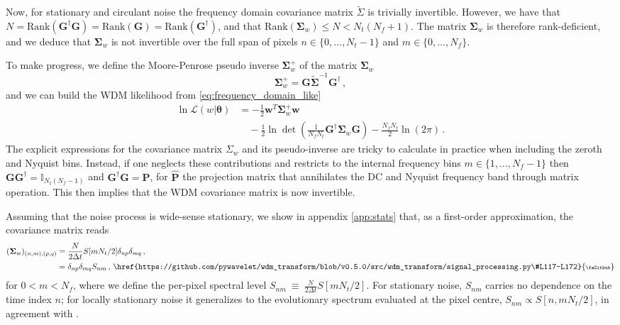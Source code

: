 \documentclass[twocolumn,preprintnumbers,
  superscriptaddress,
  nofootinbib,
  amsmath,
  amssymb,
  aps,
  prd,
  colorlinks=true,
  linkcolor=blue,
  urlcolor=blue,
  citecolor=blue,
  anchorcolor=blue
]{revtex4-2}
\DeclareRobustCommand{\codelink}[1]{\,\href{#1}{\mbox{\scalebox{0.65}{\faGithub}}}}
\begin{document}
Now, for stationary and circulant noise the frequency domain covariance matrix $\tilde{\Sigma}$ is trivially invertible. However, we have that $N = \text{Rank}(\boldsymbol{G}^{\dagger}\boldsymbol{G}) = \text{Rank}(\boldsymbol{G}) = \text{Rank}(\boldsymbol{G}^{\dagger})$, and that $\text{Rank}(\boldsymbol{\Sigma}_w)  \leq N < N_t(N_f+1)$. The matrix $\boldsymbol{\Sigma}_{w}$ is therefore rank-deficient, and we deduce that $\boldsymbol{\Sigma}_{w}$ is not invertible over the full span of pixels $n \in \{0,\ldots, N_t -1\}$ and $m\in\{0, \ldots, N_f\}$.

To make progress, we define the Moore-Penrose pseudo inverse $\boldsymbol{\Sigma}^+_{w}$ of the matrix $\boldsymbol{\Sigma}_w$
%
\begin{equation}\label{eq:pseudo_inv_cov}
\boldsymbol{\Sigma}_w^{+} = \boldsymbol{G}\tilde{\boldsymbol{\Sigma}}^{-1}\boldsymbol{G}^{\dagger}\,,
\end{equation}
%
and we can build the WDM likelihood from \eqref{eq:frequency_domain_like}
%
\begin{align}\label{eq:likelihood_G_Sigma_w}
    \ln\mathcal{L}(w|\boldsymbol{\theta}) &= -\frac{1}{2}\boldsymbol{w}^{T}\boldsymbol{\Sigma}_{w}^{+}\boldsymbol{w}  \\
    & \quad - \frac{1}{2}\ln\det \left(\frac{1}{N_fN_t}\boldsymbol{G}^{\dagger}\boldsymbol{\Sigma}_{w}\boldsymbol{G}\right) - \frac{N_fN_t}{2}\ln(2\pi)\,.
\end{align}
%
The explicit expressions for the covariance matrix $\Sigma_w$ and its pseudo-inverse are tricky to calculate in practice when including the zeroth and Nyquist bins. Instead, if one neglects these contributions and restricts to the internal frequency bins $m \in \{1, \ldots, N_f-1\}$ then  $\boldsymbol{G}\boldsymbol{G}^{\dagger} = \mathbb{I}_{N_t(N_f -1)}$ and $\boldsymbol{G}^{\dagger}\boldsymbol{G} = \hat{\boldsymbol{P}}$, for $\hat{\boldsymbol{P}}$ the projection matrix that annihilates the DC and Nyquist frequency band through matrix operation. This then implies that the WDM covariance matrix is now invertible. 

Assuming that the noise process is wide-sense stationary, we show in appendix \ref{app:stats} that, as a first-order approximation, the covariance matrix reads
%
\begin{align}\label{eq:Sigma_W_diagonal}
(\boldsymbol{\Sigma}_w)_{(n,m),(p,q)} &= \frac{N}{2\Delta t} S[mN_t/2]\delta_{np}\delta_{mq}\,, \\
& = \delta_{np}\delta_{mq}S_{nm}\,,\codelink{https://github.com/pywavelet/wdm_transform/blob/v0.5.0/src/wdm_transform/signal_processing.py\#L117-L172} 
\end{align}
%
for $0 < m < N_f$, where we define the per-pixel spectral level $S_{nm}~\equiv~\frac{N}{2\Delta t} S[mN_t/2]$. For stationary noise, $S_{nm}$ carries no dependence on the time index $n$; for locally stationary noise it generalizes to the evolutionary spectrum evaluated at the pixel centre, $S_{nm} \propto S[n, mN_t/2]$, in agreement with \cite{cornish_nonstationary_wdm}.
\end{document}
